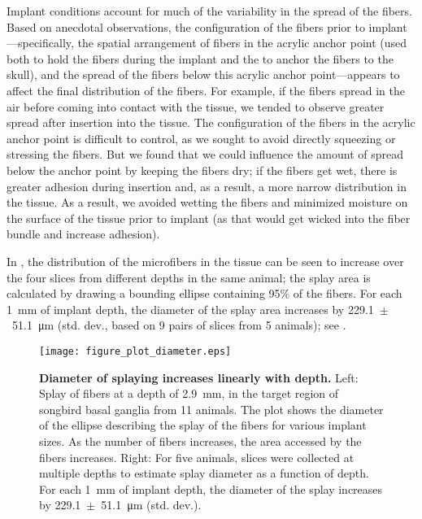 Implant conditions account for much of the variability in 
the spread of the fibers. Based on anecdotal observations, 
the configuration of the fibers prior 
to implant---specifically, the spatial arrangement of fibers 
in the acrylic anchor point (used both to hold the fibers 
during the implant and the to anchor the fibers to the 
skull), and the spread of the fibers below this acrylic 
anchor point---appears to affect the final distribution of 
the fibers. For example, if the fibers spread in the air 
before coming into contact with the tissue, we tended to 
observe greater spread after insertion into the tissue. 
The configuration of the fibers in the acrylic anchor point 
is difficult to control, as we sought to avoid directly 
squeezing or stressing the fibers. But we found that we 
could influence the amount of spread below the anchor point 
by keeping the fibers dry; if the fibers get wet, there is 
greater adhesion during insertion and, as a result, a more 
narrow distribution in the tissue. As a result, we avoided 
wetting the fibers and minimized moisture on the surface of 
the tissue prior to implant (as that would get wicked into 
the fiber bundle and increase adhesion).

In , the distribution of the microfibers in 
the tissue can be seen to increase over the four slices from 
different depths in the same animal; the splay area is calculated by drawing a 
bounding ellipse containing 95\% of the fibers. For each 1~mm of 
implant depth, the diameter of the splay area increases by 
229.1~$\pm$~51.1~\si{\micro\meter} (std. dev., 
based on 9 pairs of slices from 5 animals); see 
.

\begin{figure}
\texttt{[image: figure\_plot\_diameter.eps]}
\caption[Diameter of fiber splay as a function of fiber count 
and depth.]{\textbf{Diameter of splaying increases linearly with 
depth.} Left: Splay of fibers at a depth of 2.9~mm, in the 
target region of songbird basal ganglia from 11 animals. The plot shows the 
diameter of the ellipse describing the splay of the fibers 
for various implant sizes. As the number of fibers increases, 
the area accessed by the fibers increases. Right: For five 
animals, slices were collected at multiple depths to estimate 
splay diameter as a function of depth. For each 1~mm of 
implant depth, the diameter of the splay increases by 
229.1~$\pm$~51.1~\si{\micro\meter} (std. dev.).}
\label{fig:plot_diameter}
\end{figure}


